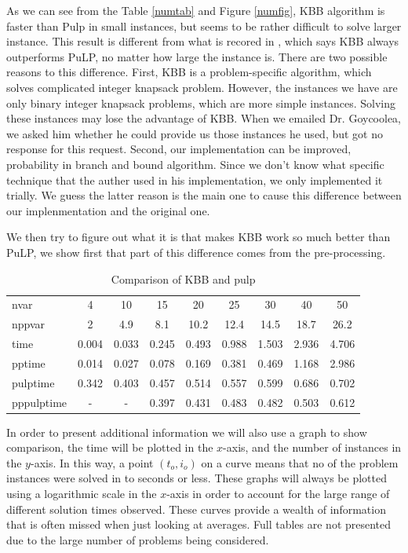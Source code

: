 \documentclass[a4paper,11pt]{article}
\begin{document}
As we can see from the Table \ref{numtab} and Figure \ref{numfig}, KBB algorithm is faster than Pulp in small instances, but seems to be rather difficult to solve larger instance. This result is different from what is recored in \cite{fukasawa2011exact}, which says KBB always outperforms PuLP, no matter how large the instance is. There are two possible reasons to this difference. First, KBB is a problem-specific algorithm, which solves complicated integer knapsack problem. However, the instances we have are only binary integer knapsack problems, which are more simple instances. Solving these instances may lose the advantage of KBB. When we emailed Dr. Goycoolea, we asked him whether he could provide us those instances he used, but got no response for this request. Second, our implementation can be improved, probability in branch and bound algorithm. Since we don't know what specific technique that the auther used in his implementation, we only implemented it trially. We guess the latter reason is the main one to cause this difference between our implenmentation and the original one.

We then try to figure out what it is that makes KBB work so much better than PuLP,  we show first that part of this difference comes from the pre-processing.
\begin{table}[H]
\begin{center}
\begin{tabular}{l c c c c c c c c}
\hline
nvar&4&10&15&20&25&30&40&50\\
nppvar &2&4.9 &8.1 &10.2 &12.4 &14.5 &18.7 &26.2\\
time&0.004&0.033&0.245&0.493&0.988&1.503&2.936&4.706\\
pptime&0.014&0.027&0.078&0.169&0.381&0.469&1.168&2.986\\
pulptime&0.342&0.403&0.457&0.514&0.557&0.599&0.686&0.702\\
pppulptime&-&-&0.397&0.431&0.483&0.482&0.503&0.612\\
\hline
\end{tabular}
\end{center}
\caption{Comparison of KBB and pulp\label{numtabp}}
\end{table}

In order to present additional information we will also use a graph to show comparison, the time will be plotted in the $x$-axis, and the number of instances in the $y$-axis. In this way, a point $(t_o,i_o)$ on a curve means that no of the problem instances were solved in to seconds or less. These graphs will always be plotted using a logarithmic scale in the $x$-axis in order to account for the large range of different solution times observed. These curves provide a wealth of information that is often missed when just looking at averages. Full tables are not presented due to the large number of problems being considered.
\end{document}
